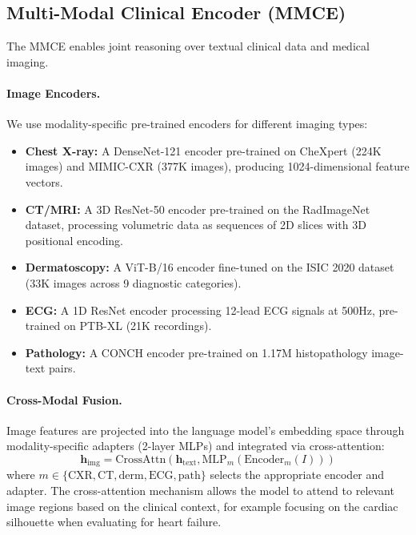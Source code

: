\documentclass[11pt,a4paper]{article}
\begin{document}
\subsection{Multi-Modal Clinical Encoder (MMCE)}
\label{sec:mmce}

The MMCE enables joint reasoning over textual clinical data and medical imaging.

\paragraph{Image Encoders.} We use modality-specific pre-trained encoders for different imaging types:
\begin{itemize}
    \item \textbf{Chest X-ray:} A DenseNet-121 encoder pre-trained on CheXpert (224K images) and MIMIC-CXR (377K images), producing 1024-dimensional feature vectors.
    \item \textbf{CT/MRI:} A 3D ResNet-50 encoder pre-trained on the RadImageNet dataset, processing volumetric data as sequences of 2D slices with 3D positional encoding.
    \item \textbf{Dermatoscopy:} A ViT-B/16 encoder fine-tuned on the ISIC 2020 dataset (33K images across 9 diagnostic categories).
    \item \textbf{ECG:} A 1D ResNet encoder processing 12-lead ECG signals at 500Hz, pre-trained on PTB-XL (21K recordings).
    \item \textbf{Pathology:} A CONCH encoder \citep{lu2024visual} pre-trained on 1.17M histopathology image-text pairs.
\end{itemize}

\paragraph{Cross-Modal Fusion.} Image features are projected into the language model's embedding space through modality-specific adapters (2-layer MLPs) and integrated via cross-attention:
\begin{equation}
    \bm{h}_{\text{img}} = \text{CrossAttn}(\bm{h}_{\text{text}}, \text{MLP}_m(\text{Encoder}_m(I)))
\end{equation}
where $m \in \{\text{CXR}, \text{CT}, \text{derm}, \text{ECG}, \text{path}\}$ selects the appropriate encoder and adapter. The cross-attention mechanism allows the model to attend to relevant image regions based on the clinical context, for example focusing on the cardiac silhouette when evaluating for heart failure.
\end{document}
